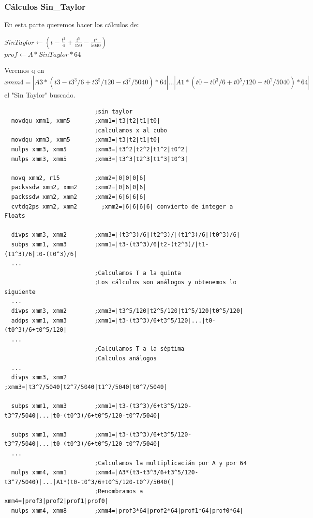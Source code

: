 \subsubsection*{Cálculos Sin_Taylor}
En esta parte queremos hacer los cálculos de:
\begin{center}
	$SinTaylor \gets (t - \frac{t^3}{6}+\frac{t^5}{120}-\frac{t^7}{5040})$ \\
	$prof \gets A * SinTaylor*64$
\end{center}
Veremos q en $xmm4=|A3*(t3-t3^3/6+t3^5/120-t3^7/5040)*64|...|A1*(t0-t0^3/6+t0^5/120-t0^7/5040)*64|$ el "Sin Taylor" buscado.
\begin{codesnippet}
\begin{verbatim}
                          ;sin taylor
  movdqu xmm1, xmm5       ;xmm1=|t3|t2|t1|t0|
                          ;calculamos x al cubo
  movdqu xmm3, xmm5       ;xmm3=|t3|t2|t1|t0|
  mulps xmm3, xmm5        ;xmm3=|t3^2|t2^2|t1^2|t0^2|
  mulps xmm3, xmm5        ;xmm3=|t3^3|t2^3|t1^3|t0^3|	

  movq xmm2, r15          ;xmm2=|0|0|0|6|
  packssdw xmm2, xmm2     ;xmm2=|0|6|0|6|
  packssdw xmm2, xmm2     ;xmm2=|6|6|6|6|
  cvtdq2ps xmm2, xmm2	    ;xmm2=|6|6|6|6| convierto de integer a Floats

  divps xmm3, xmm2        ;xmm3=|(t3^3)/6|(t2^3)/|(t1^3)/6|(t0^3)/6|
  subps xmm1, xmm3        ;xmm1=|t3-(t3^3)/6|t2-(t2^3)/|t1-(t1^3)/6|t0-(t0^3)/6|
  ...              
                          ;Calculamos T a la quinta
                          ;Los cálculos son análogos y obtenemos lo siguiente
  ...
  divps xmm3, xmm2        ;xmm3=|t3^5/120|t2^5/120|t1^5/120|t0^5/120|								
  addps xmm1, xmm3        ;xmm1=|t3-(t3^3)/6+t3^5/120|...|t0-(t0^3)/6+t0^5/120|								
  ...
                          ;Calculamos T a la séptima
                          ;Calculos análogos
  ...
  divps xmm3, xmm2        ;xmm3=|t3^7/5040|t2^7/5040|t1^7/5040|t0^7/5040|
                  
  subps xmm1, xmm3        ;xmm1=|t3-(t3^3)/6+t3^5/120-t3^7/5040|...|t0-(t0^3)/6+t0^5/120-t0^7/5040|

  subps xmm1, xmm3        ;xmm1=|t3-(t3^3)/6+t3^5/120-t3^7/5040|...|t0-(t0^3)/6+t0^5/120-t0^7/5040|								
  ...
                          ;Calculamos la multiplicacián por A y por 64
  mulps xmm4, xmm1        ;xmm4=|A3*(t3-t3^3/6+t3^5/120-t3^7/5040)|...|A1*(t0-t0^3/6+t0^5/120-t0^7/5040(|
                          ;Renombramos a xmm4=|prof3|prof2|prof1|prof0|		
  mulps xmm4, xmm8        ;xmm4=|prof3*64|prof2*64|prof1*64|prof0*64|

\end{verbatim}
\end{codesnippet}

